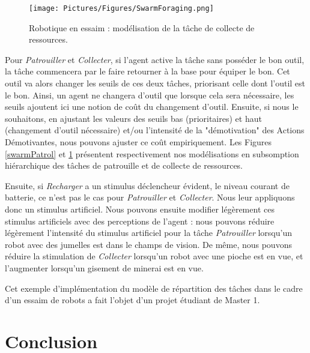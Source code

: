 	\begin{figure}	
	\centering
	\texttt{[image: Pictures/Figures/SwarmForaging.png]}
	\caption{Robotique en essaim : modélisation de la tâche de collecte de ressources.}
	\label{swarmForaging}
	\end{figure}
		
		Pour \textit{Patrouiller} et \textit{Collecter}, si l'agent active la tâche sans posséder le bon outil, la tâche commencera par le faire retourner à la base pour équiper le bon. Cet outil va alors changer les seuils de ces deux tâches, priorisant celle dont l'outil est le bon. Ainsi, un agent ne changera d'outil que lorsque cela sera nécessaire, les seuils ajoutent ici une notion de coût du changement d'outil. Ensuite, si nous le souhaitons, en ajustant les valeurs des seuils bas (prioritaires) et haut (changement d'outil nécessaire) et/ou l'intensité de la "démotivation" des Actions Démotivantes, nous pouvons ajuster ce coût empiriquement. Les Figures \ref{swarmPatrol} et \ref{swarmForaging} présentent respectivement nos modélisations en subsomption hiérarchique des tâches de patrouille et de collecte de ressources. 
		
		Ensuite, si \textit{Recharger} a un stimulus déclencheur évident, le niveau courant de batterie, ce n'est pas le cas pour \textit{Patrouiller} et \textit{Collecter}. Nous leur appliquons donc un stimulus artificiel. Nous pouvons ensuite modifier légèrement ces stimulus artificiels avec des perceptions de l'agent : nous pouvons réduire légèrement l'intensité du stimulus artificiel pour la tâche \textit{Patrouiller} lorsqu'un robot avec des jumelles est dans le champs de vision. De même, nous pouvons réduire la stimulation de \textit{Collecter} lorsqu'un robot avec une pioche est en vue, et l'augmenter lorsqu'un gisement de minerai est en vue.
		
		Cet exemple d'implémentation du modèle de répartition des tâches dans le cadre d'un essaim de robots a fait l'objet d'un projet étudiant de Master 1.
			
			
				
	\section*{Conclusion}
